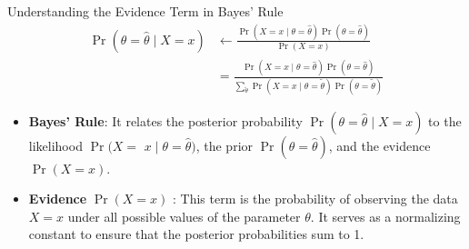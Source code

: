 \documentclass[9pt,dvipsnames]{beamer}
\begin{document}
\begin{frame}{Understanding the Evidence Term in Bayes' Rule}
	\begin{equation*}
		\begin{aligned}
			\operatorname{Pr}(\theta=\hat{\theta} \mid X=x) & \leftarrow \frac{\operatorname{Pr}(X=x \mid \theta=\hat{\theta}) \operatorname{Pr}(\theta=\hat{\theta})}{\operatorname{Pr}(X=x)}                                                                                  \\
			                                                & = \frac{\operatorname{Pr}(X=x \mid \theta=\hat{\theta}) \operatorname{Pr}(\theta=\hat{\theta})}{\sum_{\tilde{\theta}} \operatorname{Pr}(X=x \mid \theta=\tilde{\theta}) \operatorname{Pr}(\theta=\tilde{\theta})}
		\end{aligned}
	\end{equation*}

	\begin{itemize}
		\item \textbf{Bayes' Rule}: It relates the posterior probability $\operatorname{Pr}(\theta=\hat{\theta} \mid X=x)$ to the likelihood $\operatorname{Pr}(X=$ $x \mid \theta=\hat{\theta})$, the prior $\operatorname{Pr}(\theta=\hat{\theta})$, and the evidence $\operatorname{Pr}(X=x)$.
		\item \textbf{Evidence} $\operatorname{Pr}(X=x)$ : This term is the probability of observing the data $X=x$ under all possible values of the parameter $\theta$. It serves as a normalizing constant to ensure that the posterior probabilities sum to 1.
	\end{itemize}
\end{frame}
\end{document}
